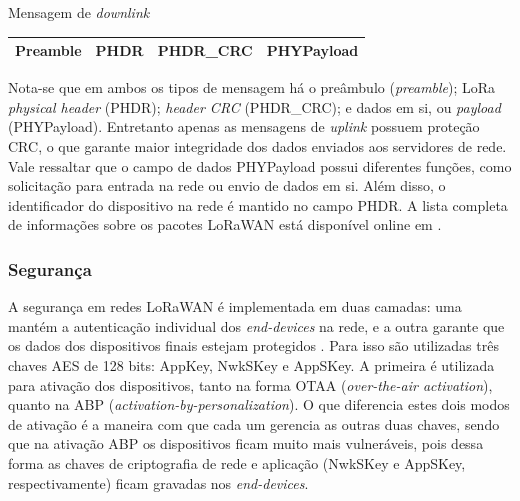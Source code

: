 \documentclass[oneside,openright,12pt]{ufsm_2015} %
\begin{document}
\begin{quadro}
   	    \caption{Mensagem de \textit{downlink}}
	    \centering
	    \begin{tabular}{| c | c | c | c |}
	    \hline
	    Preamble & PHDR & PHDR\_CRC & PHYPayload \\
	    \hline
	    \end{tabular}
	    \vspace{\baselineskip} %
	    \label{downlink-msg}
\end{quadro}

Nota-se que em ambos os tipos de mensagem há o preâmbulo (\textit{preamble}); LoRa \textit{physical header} (PHDR); \textit{header CRC} (PHDR\_CRC); e dados em si, ou \textit{payload} (PHYPayload). Entretanto apenas as mensagens de \textit{uplink} possuem proteção CRC, o que garante maior integridade dos dados enviados aos servidores de rede. Vale ressaltar que o campo de dados PHYPayload possui diferentes funções, como solicitação para entrada na rede ou envio de dados em si. Além disso, o identificador do dispositivo na rede é mantido no campo PHDR. A lista completa de informações sobre os pacotes LoRaWAN está disponível online em \cite{lorawan-specification}.


\subsubsection{Segurança}
A segurança em redes LoRaWAN é implementada em duas camadas: uma mantém a autenticação individual dos \textit{end-devices} na rede, e a outra garante que os dados dos dispositivos finais estejam protegidos \cite{lora-overview}. Para isso são utilizadas três chaves AES de 128 bits:  AppKey, NwkSKey e AppSKey. A primeira é utilizada para ativação dos dispositivos, tanto na forma OTAA (\textit{over-the-air activation}), quanto na ABP (\textit{activation-by-personalization}). O que diferencia estes dois modos de ativação é a maneira com que cada um gerencia as outras duas chaves, sendo que na ativação ABP os dispositivos ficam muito mais vulneráveis, pois dessa forma as chaves de criptografia de rede e aplicação (NwkSKey e AppSKey, respectivamente) ficam gravadas nos \textit{end-devices}.
\end{document}
